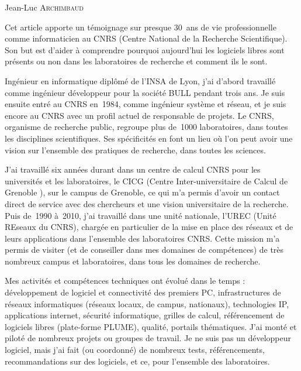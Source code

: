 \documentclass{FramateX}
\begin{document}
\begin{refsection}

\begin{flushright}
Jean-Luc \textsc{Archimbaud}
\end{flushright}
\vspace{10 mm}



Cet article apporte un témoignage sur presque 30~ans de vie
professionnelle comme informaticien au CNRS (Centre
National de la Recherche Scientifique). Son but est d'aider à
comprendre pourquoi aujourd'hui les logiciels libres sont présents ou
non dans les laboratoires de recherche et comment ils le sont.

Ingénieur en informatique diplômé de l'INSA de Lyon, j'ai d'abord
travaillé comme ingénieur développeur pour la société BULL pendant
trois ans. Je suis ensuite entré au CNRS en~1984, comme ingénieur
système et réseau, et je suis encore au CNRS avec un profil actuel de
responsable de projets. Le CNRS, organisme de recherche public,
regroupe plus de~1000 laboratoires, dans toutes les disciplines
scientifiques. Ses spécificités en font un lieu où l'on peut avoir une
vision sur l'ensemble des pratiques de recherche, dans toutes les
sciences.

J'ai travaillé six années durant dans un centre de calcul CNRS pour les
universités et les laboratoires, le CICG (Centre Inter-universitaire de
Calcul de Grenoble ), sur le campus de Grenoble, ce qui m'a permis
d'avoir un contact direct de service avec des chercheurs et une vision
universitaire de la recherche. Puis de~1990 à~2010, j'ai travaillé dans
une unité nationale, l'UREC (Unité REseaux du CNRS), chargée en
particulier de la mise en place des réseaux et de leurs applications
dans l'ensemble des laboratoires CNRS. Cette mission m'a permis de
visiter (et de conseiller dans mes domaines de compétences) de très
nombreux campus et laboratoires, dans tous les domaines de recherche. 

Mes activités et compétences techniques ont évolué dans le temps :
développement de logiciel et connectivité des premiers PC,
infrastructures de réseaux informatiques (réseaux locaux, de campus,
nationaux), technologies IP, applications internet, sécurité
informatique, grilles de calcul, référencement de logiciels libres
(plate-forme PLUME), qualité, portails thématiques. J'ai monté et
piloté de nombreux projets ou groupes de travail. Je ne suis pas un
développeur logiciel, mais j'ai fait (ou coordonné) de nombreux tests,
référencements, recommandations sur des logiciels, et ce, pour
l'ensemble des laboratoires.


\end{refsection}
\end{document}
